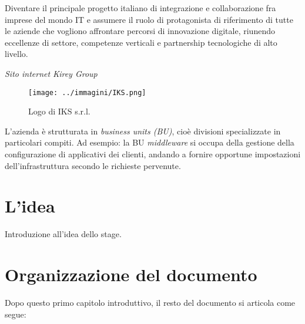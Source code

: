 \begin{shadequote}
    Diventare il principale progetto italiano di integrazione e collaborazione fra imprese del mondo IT e assumere il ruolo di protagonista di riferimento di tutte le aziende che vogliono affrontare percorsi di innovazione digitale, riunendo eccellenze di settore, competenze verticali e partnership tecnologiche di alto livello.\par\emph{Sito internet Kirey Group}
\end{shadequote}


\vspace{2.5em}
\begin{figure}[H]
    \capstart
    \centering
    \texttt{[image: ../immagini/IKS.png]}
    \caption{Logo di IKS s.r.l.}
\end{figure}

L'azienda è strutturata in \textit{business units (BU)}, cioè divisioni specializzate in particolari compiti. Ad esempio: la BU \textit{\gls{middleware}} si occupa della gestione della configurazione di applicativi dei clienti, andando a fornire opportune impostazioni dell'infrastruttura secondo le richieste pervenute.


\section{L'idea}
Introduzione all'idea dello stage.

\section{Organizzazione del documento}

Dopo questo primo capitolo introduttivo, il resto del documento si articola come segue:

